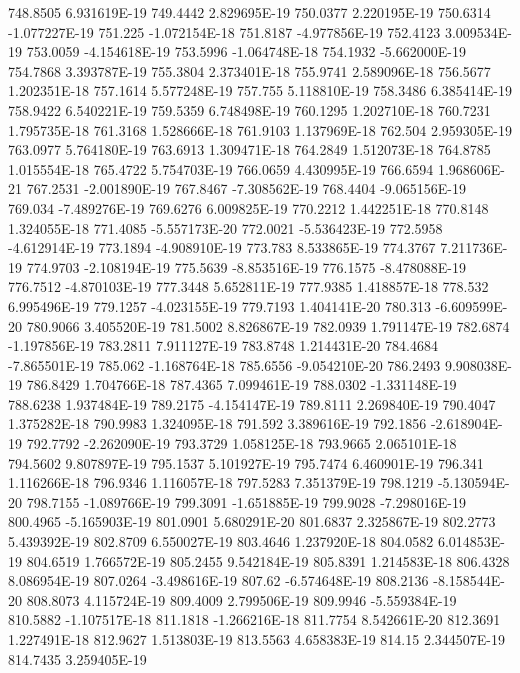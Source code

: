 748.8505  6.931619E-19
749.4442  2.829695E-19
750.0377  2.220195E-19
750.6314  -1.077227E-19
751.225  -1.072154E-18
751.8187  -4.977856E-19
752.4123  3.009534E-19
753.0059  -4.154618E-19
753.5996  -1.064748E-18
754.1932  -5.662000E-19
754.7868  3.393787E-19
755.3804  2.373401E-18
755.9741  2.589096E-18
756.5677  1.202351E-18
757.1614  5.577248E-19
757.755  5.118810E-19
758.3486  6.385414E-19
758.9422  6.540221E-19
759.5359  6.748498E-19
760.1295  1.202710E-18
760.7231  1.795735E-18
761.3168  1.528666E-18
761.9103  1.137969E-18
762.504  2.959305E-19
763.0977  5.764180E-19
763.6913  1.309471E-18
764.2849  1.512073E-18
764.8785  1.015554E-18
765.4722  5.754703E-19
766.0659  4.430995E-19
766.6594  1.968606E-21
767.2531  -2.001890E-19
767.8467  -7.308562E-19
768.4404  -9.065156E-19
769.034  -7.489276E-19
769.6276  6.009825E-19
770.2212  1.442251E-18
770.8148  1.324055E-18
771.4085  -5.557173E-20
772.0021  -5.536423E-19
772.5958  -4.612914E-19
773.1894  -4.908910E-19
773.783  8.533865E-19
774.3767  7.211736E-19
774.9703  -2.108194E-19
775.5639  -8.853516E-19
776.1575  -8.478088E-19
776.7512  -4.870103E-19
777.3448  5.652811E-19
777.9385  1.418857E-18
778.532  6.995496E-19
779.1257  -4.023155E-19
779.7193  1.404141E-20
780.313  -6.609599E-20
780.9066  3.405520E-19
781.5002  8.826867E-19
782.0939  1.791147E-19
782.6874  -1.197856E-19
783.2811  7.911127E-19
783.8748  1.214431E-20
784.4684  -7.865501E-19
785.062  -1.168764E-18
785.6556  -9.054210E-20
786.2493  9.908038E-19
786.8429  1.704766E-18
787.4365  7.099461E-19
788.0302  -1.331148E-19
788.6238  1.937484E-19
789.2175  -4.154147E-19
789.8111  2.269840E-19
790.4047  1.375282E-18
790.9983  1.324095E-18
791.592  3.389616E-19
792.1856  -2.618904E-19
792.7792  -2.262090E-19
793.3729  1.058125E-18
793.9665  2.065101E-18
794.5602  9.807897E-19
795.1537  5.101927E-19
795.7474  6.460901E-19
796.341  1.116266E-18
796.9346  1.116057E-18
797.5283  7.351379E-19
798.1219  -5.130594E-20
798.7155  -1.089766E-19
799.3091  -1.651885E-19
799.9028  -7.298016E-19
800.4965  -5.165903E-19
801.0901  5.680291E-20
801.6837  2.325867E-19
802.2773  5.439392E-19
802.8709  6.550027E-19
803.4646  1.237920E-18
804.0582  6.014853E-19
804.6519  1.766572E-19
805.2455  9.542184E-19
805.8391  1.214583E-18
806.4328  8.086954E-19
807.0264  -3.498616E-19
807.62  -6.574648E-19
808.2136  -8.158544E-20
808.8073  4.115724E-19
809.4009  2.799506E-19
809.9946  -5.559384E-19
810.5882  -1.107517E-18
811.1818  -1.266216E-18
811.7754  8.542661E-20
812.3691  1.227491E-18
812.9627  1.513803E-19
813.5563  4.658383E-19
814.15  2.344507E-19
814.7435  3.259405E-19
